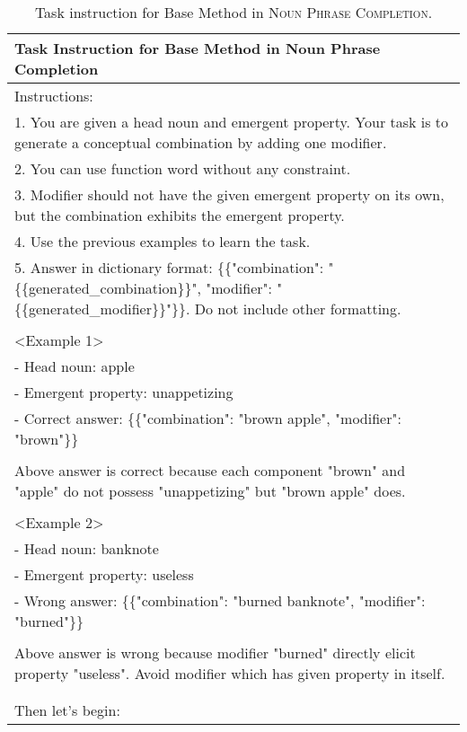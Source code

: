 \begin{table*}[htbp]
\scriptsize
\centering
\begin{tabular}{@{}p{\linewidth}@{}}
\toprule
\textbf{Task Instruction for Base Method in Noun Phrase Completion}\\
\midrule
Instructions:\\
1. You are given a head noun and emergent property. Your task is to generate a conceptual combination by adding one modifier.\\
2. You can use function word without any constraint.\\
3. Modifier should not have the given emergent property on its own, but the combination exhibits the emergent property.\\
4. Use the previous examples to learn the task.\\
5. Answer in dictionary format: \{\{"combination": "\{\{generated\_combination\}\}", "modifier": "\{\{generated\_modifier\}\}"\}\}. Do not include other formatting.\\
\\
<Example 1>\\
- Head noun: apple\\
- Emergent property: unappetizing\\
- Correct answer: \{\{"combination": "brown apple", "modifier": "brown"\}\}\\
\\
Above answer is correct because each component "brown" and "apple" do not possess "unappetizing" but "brown apple" does.\\
\\
<Example 2>\\
- Head noun: banknote\\
- Emergent property: useless\\
- Wrong answer: \{\{"combination": "burned banknote", "modifier": "burned"\}\}\\
\\
Above answer is wrong because modifier "burned" directly elicit property "useless". Avoid modifier which has given property in itself.\\
\\
\\
Then let's begin:\\
\bottomrule
\end{tabular}
    \caption{Task instruction for Base Method in \textsc{Noun Phrase Completion}.}
\label{tab:npc_prompt_base}
\end{table*}